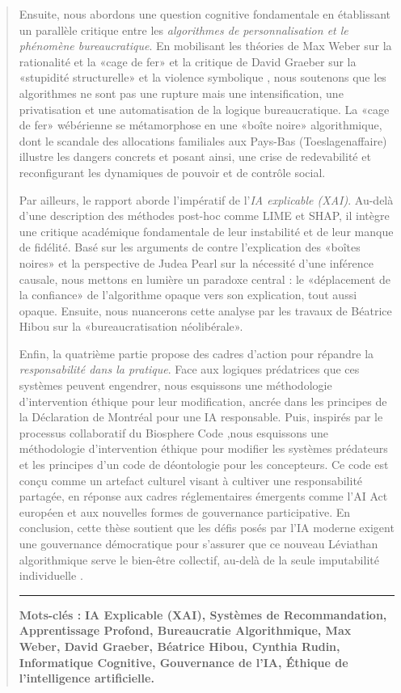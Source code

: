\begin{quote}
Ensuite, nous abordons une question cognitive fondamentale en établissant un parallèle critique entre les \textit{algorithmes de personnalisation et le phénomène bureaucratique}. En mobilisant les théories de Max Weber sur la rationalité et la «cage de fer» \citep{Weber1922, Serpa2019} et la critique de David Graeber sur la «stupidité structurelle» et la violence symbolique \citep{Graeber2015}, nous soutenons que les algorithmes ne sont pas une rupture mais une intensification, une privatisation et une automatisation de la logique bureaucratique. La «cage de fer» wébérienne se métamorphose en une «boîte noire» algorithmique, dont le scandale des allocations familiales aux Pays-Bas (Toeslagenaffaire) illustre les dangers concrets et posant ainsi, une crise de redevabilité et reconfigurant les dynamiques de pouvoir et de contrôle social.

Par ailleurs, le rapport aborde l'impératif de l'\textit{IA explicable (XAI)}. Au-delà d'une description des méthodes post-hoc comme LIME et SHAP, il intègre une critique académique fondamentale de leur instabilité et de leur manque de fidélité. Basé sur les arguments de \citet{Rudin2019} contre l'explication des «boîtes noires» et la perspective de Judea Pearl sur la nécessité d'une inférence causale, nous mettons en lumière un paradoxe central : le «déplacement de la confiance» de l'algorithme opaque vers son explication, tout aussi opaque. Ensuite, nous nuancerons cette analyse par les travaux de Béatrice Hibou sur la «bureaucratisation néolibérale».

Enfin, la quatrième partie propose des cadres d'action pour répandre la \textit{responsabilité dans la pratique}. Face aux logiques prédatrices que ces systèmes peuvent engendrer, nous esquissons une méthodologie d'intervention éthique pour leur modification, ancrée dans les principes de la Déclaration de Montréal pour une IA responsable. Puis, inspirés par le processus collaboratif du Biosphere Code \citep{BiosphereCode2015},nous esquissons une méthodologie d'intervention éthique pour modifier les systèmes prédateurs et les principes d'un code de déontologie pour les concepteurs. Ce code est conçu comme un artefact culturel visant à cultiver une responsabilité partagée, en réponse aux cadres réglementaires émergents comme l'AI Act européen et aux nouvelles formes de gouvernance participative. En conclusion, cette thèse soutient que les défis posés par l'IA moderne exigent une gouvernance démocratique pour s'assurer que ce nouveau Léviathan algorithmique serve le bien-être collectif, au-delà de la seule imputabilité individuelle \citep{Neuer2018}. \\
\vspace{0.1em}
\hrule
\noindent
{\footnotesize \textbf{Mots-clés :} {\tiny \textbf{ IA Explicable (XAI), Systèmes de Recommandation, Apprentissage Profond, Bureaucratie Algorithmique, Max Weber, David Graeber, Béatrice Hibou, Cynthia Rudin, Informatique Cognitive, Gouvernance de l'IA, Éthique de l'intelligence artificielle.}}}

\end{quote}
